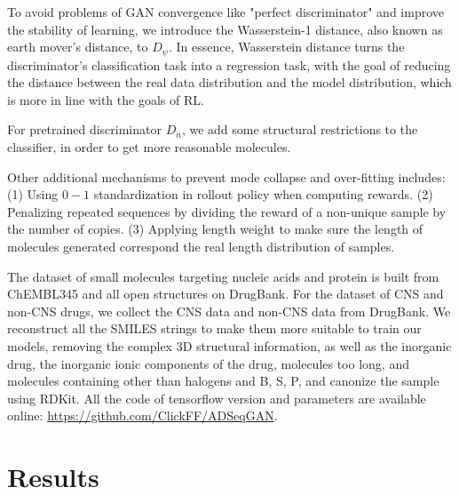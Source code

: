 \documentclass[10pt, twocolumn]{article}
\begin{document}
To avoid problems of GAN convergence like "perfect discriminator" and improve the stability of learning, we introduce the Wasserstein-1 distance, also known as earth mover's distance\cite{Gulrajani2017}, to $D_{\psi}$. In essence, Wasserstein distance turns the discriminator's classification task into a regression task, with the goal of reducing the distance between the real data distribution and the model distribution, which is more in line with the goals of RL.

For pretrained discriminator $D_n$, we add some structural restrictions to the classifier, in order to get more reasonable molecules. 

Other additional mechanisms to prevent mode collapse and over-fitting includes: (1) Using $0-1$ standardization in rollout policy when computing rewards. (2) Penalizing repeated sequences by dividing the reward of a non-unique sample by the number of copies. (3) Applying length weight to make sure the length of molecules generated correspond the real length distribution of samples.

The dataset of small molecules targeting nucleic acids and protein is built from ChEMBL345 \cite{Gaulton2012,Zdrazil2024} and all open structures on DrugBank\cite{Knox2023}. For the dataset of CNS and non-CNS drugs, we collect the CNS data and non-CNS data from DrugBank. We reconstruct all the SMILES strings to make them more suitable to train our models, removing the complex 3D structural information, as well as the inorganic drug, the inorganic ionic components of the drug, molecules too long, and molecules containing other than halogens and B, S, P, and canonize the sample using RDKit. All the code of tensorflow version and parameters are available online: \href{https://github.com/ClickFF/ADSeqGAN}{https://github.com/ClickFF/ADSeqGAN}. 

\section{Results}


\renewcommand{\arraystretch}{1.5} %
\end{document}
